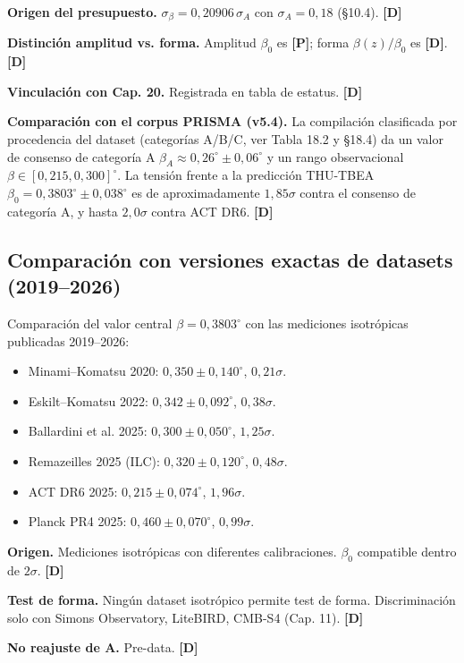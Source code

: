 ﻿\documentclass[11pt,letterpaper]{article}
\begin{document}
\textbf{Origen del presupuesto.} $\sigma_\beta = 0{,}20906\,\sigma_A$ con $\sigma_A = 0{,}18$ (§10.4). \textbf{[D]}

\textbf{Distinción amplitud vs. forma.} Amplitud $\beta_0$ es \textbf{[P]}; forma $\beta(z)/\beta_0$ es \textbf{[D]}. \textbf{[D]}

\textbf{Vinculación con Cap. 20.} Registrada en tabla de estatus. \textbf{[D]}

\textbf{Comparación con el corpus PRISMA (v5.4).} La compilación clasificada por procedencia del dataset (categorías A/B/C, ver Tabla 18.2 y §18.4) da un valor de consenso de categoría A $\beta_A \approx 0{,}26^\circ \pm 0{,}06^\circ$ y un rango observacional $\beta \in [0{,}215, 0{,}300]^\circ$. La tensión frente a la predicción THU-TBEA $\beta_0 = 0{,}3803^\circ \pm 0{,}038^\circ$ es de aproximadamente $1{,}85\sigma$ contra el consenso de categoría A, y hasta $2{,}0\sigma$ contra ACT DR6. \textbf{[D]}
\subsection{Comparación con versiones exactas de datasets (2019–2026)}
Comparación del valor central $\beta = 0{,}3803^\circ$ con las mediciones isotrópicas publicadas 2019--2026:

\begin{itemize}[leftmargin=*]
\item Minami--Komatsu 2020: $0{,}350 \pm 0{,}140^\circ$, $0{,}21\sigma$.
\item Eskilt--Komatsu 2022: $0{,}342 \pm 0{,}092^\circ$, $0{,}38\sigma$.
\item Ballardini et al. 2025: $0{,}300 \pm 0{,}050^\circ$, $1{,}25\sigma$.
\item Remazeilles 2025 (ILC): $0{,}320 \pm 0{,}120^\circ$, $0{,}48\sigma$.
\item ACT DR6 2025: $0{,}215 \pm 0{,}074^\circ$, $1{,}96\sigma$.
\item Planck PR4 2025: $0{,}460 \pm 0{,}070^\circ$, $0{,}99\sigma$.
\end{itemize}

\textbf{Origen.} Mediciones isotrópicas con diferentes calibraciones. $\beta_0$ compatible dentro de $2\sigma$. \textbf{[D]}

\textbf{Test de forma.} Ningún dataset isotrópico permite test de forma. Discriminación solo con Simons Observatory, LiteBIRD, CMB-S4 (Cap. 11). \textbf{[D]}

\textbf{No reajuste de A.} Pre-data. \textbf{[D]}
\end{document}
